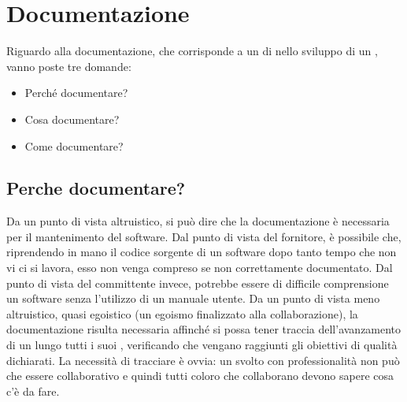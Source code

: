 \documentclass[../main]{subfiles}
\begin{document}
\section{Documentazione}
Riguardo alla documentazione, che corrisponde a un  di  nello sviluppo di un , vanno poste tre domande:
\begin{itemize}
    \item Perché documentare?
    \item Cosa documentare?
    \item Come documentare?
\end{itemize}
\subsection{Perche documentare?}
Da un punto di vista altruistico, si può dire che la documentazione è necessaria per il mantenimento del software. Dal punto di vista del fornitore, è possibile che, riprendendo in mano il codice sorgente di un software dopo tanto tempo che non vi ci si lavora, esso non venga compreso se non correttamente documentato. Dal punto di vista del committente invece, potrebbe essere di difficile comprensione un software senza l'utilizzo di un manuale utente.\newline
Da un punto di vista meno altruistico, quasi egoistico (un egoismo finalizzato alla collaborazione), la documentazione risulta necessaria affinché si possa tener traccia dell'avanzamento di un  lungo tutti i suoi , verificando che vengano raggiunti gli obiettivi di qualità dichiarati.\newline
La necessità di tracciare è ovvia: un  svolto con professionalità non può che essere collaborativo e quindi tutti coloro che collaborano devono sapere cosa c'è da fare.
\end{document}

